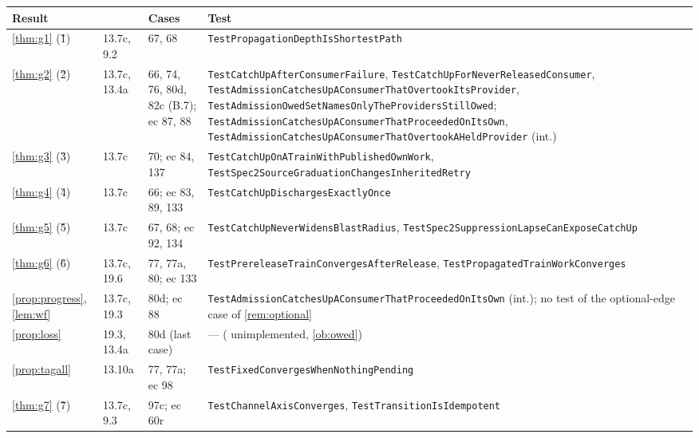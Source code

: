 \begingroup
\expandafter\def\expandafter\UrlBreaks\expandafter{\UrlBreaks\do\a\do\b\do\c\do\d\do\e\do\f\do\g\do\h\do\i\do\j\do\k\do\l\do\m\do\n\do\o\do\p\do\q\do\r\do\s\do\t\do\u\do\v\do\w\do\x\do\y\do\z\do\A\do\B\do\C\do\D\do\E\do\F\do\G\do\H\do\I\do\J\do\K\do\L\do\M\do\N\do\O\do\P\do\Q\do\R\do\S\do\T\do\U\do\V\do\W\do\X\do\Y\do\Z}
\newcommand{\tn}[1]{\nolinkurl{#1}}
\begin{center}
\footnotesize
\begin{longtable}{@{}L{2.9cm}L{1.6cm}L{2.7cm}L{7.0cm}@{}}
\toprule
Result & \SPEC{} & Cases & Test \\
\midrule
\endhead
\cref{thm:g1} (\G{1}) & 13.7c, 9.2 & 67, 68 & \tn{TestPropagationDepthIsShortestPath} \\
\cref{thm:g2} (\G{2}) & 13.7c, 13.4a & 66, 74, 76, 80d, 82c (B.7); ec 87, 88 & \tn{TestCatchUpAfterConsumerFailure}, \tn{TestCatchUpForNeverReleasedConsumer}, \tn{TestAdmissionCatchesUpAConsumerThatOvertookItsProvider}, \tn{TestAdmissionOwedSetNamesOnlyTheProvidersStillOwed}; \tn{TestAdmissionCatchesUpAConsumerThatProceededOnItsOwn}, \tn{TestAdmissionCatchesUpAConsumerThatOvertookAHeldProvider} (int.) \\
\cref{thm:g3} (\G{3}) & 13.7c & 70; ec 84, 137 & \tn{TestCatchUpOnATrainWithPublishedOwnWork}, \tn{TestSpec2SourceGraduationChangesInheritedRetry} \\
\cref{thm:g4} (\G{4}) & 13.7c & 66; ec 83, 89, 133 & \tn{TestCatchUpDischargesExactlyOnce} \\
\cref{thm:g5} (\G{5}) & 13.7c & 67, 68; ec 92, 134 & \tn{TestCatchUpNeverWidensBlastRadius}, \tn{TestSpec2SuppressionLapseCanExposeCatchUp} \\
\cref{thm:g6} (\G{6}) & 13.7c, 19.6 & 77, 77a, 80; ec 133 & \tn{TestPrereleaseTrainConvergesAfterRelease}, \tn{TestPropagatedTrainWorkConverges} \\
\cref{prop:progress}, \cref{lem:wf} & 13.7c, 19.3 & 80d; ec 88 & \tn{TestAdmissionCatchesUpAConsumerThatProceededOnItsOwn} (int.); no test of the optional-edge case of \cref{rem:optional} \\
\cref{prop:loss} & 19.3, 13.4a & 80d (last case) & --- ( unimplemented, \cref{ob:owed}) \\
\cref{prop:tagall} & 13.10a & 77, 77a; ec 98 & \tn{TestFixedConvergesWhenNothingPending} \\
\cref{thm:g7} (\G{7}) & 13.7c, 9.3 & 97c; ec 60r & \tn{TestChannelAxisConverges}, \tn{TestTransitionIsIdempotent} \\

\end{longtable}
\end{center}
